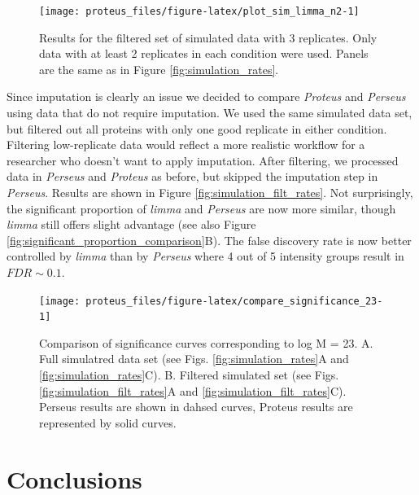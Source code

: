 \documentclass[]{article}
\begin{document}
\begin{figure}[H]

{\centering \texttt{[image: proteus\_files/figure-latex/plot\_sim\_limma\_n2-1]} 

}

\caption{\label{fig:simulation_filt_rates}Results for the filtered set of simulated data with 3 replicates. Only data with at least 2 replicates in each condition were used. Panels are the same as in Figure \ref{fig:simulation_rates}.}\label{fig:plot_sim_limma_n2}
\end{figure}

Since imputation is clearly an issue we decided to compare
\emph{Proteus} and \emph{Perseus} using data that do not require
imputation. We used the same simulated data set, but filtered out all
proteins with only one good replicate in either condition. Filtering
low-replicate data would reflect a more realistic workflow for a
researcher who doesn't want to apply imputation. After filtering, we
processed data in \emph{Perseus} and \emph{Proteus} as before, but
skipped the imputation step in \emph{Perseus}. Results are shown in
Figure \ref{fig:simulation_filt_rates}. Not surprisingly, the
significant proportion of \emph{limma} and \emph{Perseus} are now more
similar, though \emph{limma} still offers slight advantage (see also
Figure \ref{fig:significant_proportion_comparison}B). The false
discovery rate is now better controlled by \emph{limma} than by
\emph{Perseus} where 4 out of 5 intensity groups result in
\(FDR \sim 0.1\).

\begin{figure}[H]

{\centering \texttt{[image: proteus\_files/figure-latex/compare\_significance\_23-1]} 

}

\caption{\label{fig:significant_proportion_comparison}Comparison of significance curves corresponding to log M = 23. A. Full simulatred data set (see Figs. \ref{fig:simulation_rates}A and  \ref{fig:simulation_rates}C). B. Filtered simulated set (see Figs. \ref{fig:simulation_filt_rates}A and \ref{fig:simulation_filt_rates}C). Perseus results are shown in dahsed curves, Proteus results are represented by solid curves.}\label{fig:compare_significance_23}
\end{figure}

\section{Conclusions}\label{conclusions}
\end{document}

